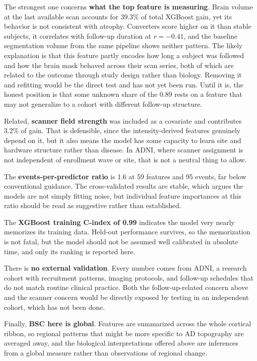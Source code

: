 \documentclass[blue]{ludusofficial}  %
\begin{document}
The strongest one concerns \textbf{what the top feature is measuring}. Brain volume at the last available scan accounts for 39.3\% of total XGBoost gain, yet its behavior is not consistent with atrophy. Converters score higher on it than stable subjects, it correlates with follow-up duration at $r = -0.41$, and the baseline segmentation volume from the same pipeline shows neither pattern. The likely explanation is that this feature partly encodes how long a subject was followed and how the brain mask behaved across their scan series, both of which are related to the outcome through study design rather than biology. Removing it and refitting would be the direct test and has not yet been run. Until it is, the honest position is that some unknown share of the 0.89 rests on a feature that may not generalize to a cohort with different follow-up structure.

Related, \textbf{scanner field strength} was included as a covariate and contributes 3.2\% of gain. That is defensible, since the intensity-derived features genuinely depend on it, but it also means the model has some capacity to learn site and hardware structure rather than disease. In ADNI, where scanner assignment is not independent of enrollment wave or site, that is not a neutral thing to allow.

The \textbf{events-per-predictor ratio} is 1.6 at 59 features and 95 events, far below conventional guidance. The cross-validated results are stable, which argues the models are not simply fitting noise, but individual feature importances at this ratio should be read as suggestive rather than established.

The \textbf{XGBoost training C-index of 0.99} indicates the model very nearly memorizes its training data. Held-out performance survives, so the memorization is not fatal, but the model should not be assumed well calibrated in absolute time, and only its ranking is reported here.

There is \textbf{no external validation}. Every number comes from ADNI, a research cohort with recruitment patterns, imaging protocols, and follow-up schedules that do not match routine clinical practice. Both the follow-up-related concern above and the scanner concern would be directly exposed by testing in an independent cohort, which has not been done.

Finally, \textbf{BSC here is global}. Features are summarized across the whole cortical ribbon, so regional patterns that might be more specific to AD topography are averaged away, and the biological interpretations offered above are inferences from a global measure rather than observations of regional change.
\end{document}
